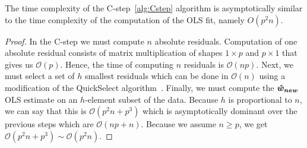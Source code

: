     






\begin{observation} \label{csteptimecomplexity}
    The time complexity of the C-step~\ref{alg:Cstep} algorithm is asymptotically similar to the time complexity of the computation of the OLS fit, namely $O(p^2n)$.
\end{observation} 

\begin{proof}
    In the C-step we must compute $n$ absolute residuals. Computation of one absolute residual consists of
    matrix multiplication of shapes $1 \times p$ and $p \times 1$ that gives us $\mathcal{O}(p)$. Hence, the time of computing $n$ residuals is $\mathcal{O}(np)$.
    Next, we must select a set of $h$ smallest residuals which can be done in $\mathcal{O}(n)$ using a modification of the QuickSelect algorithm~\cite{hoare1961algorithm}.
    Finally, we must compute the $\boldsymbol{\hat{w}_{new}}$ OLS estimate on an $h$-element subset of the data. Because $h$ is proportional to $n$, we can say that this is $\mathcal{O}(p^2n + p^3)$ which is asymptotically dominant over the previous steps which are $\mathcal{O}(np + n)$. Because we assume $n \ge p$, we get $\mathcal{O}(p^2n + p^3) \sim \mathcal{O}(p^2n) $.
\end{proof}

